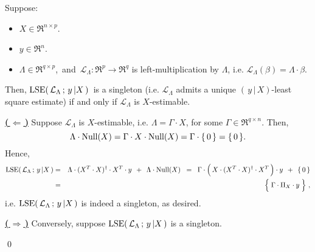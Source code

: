 \begin{theorem}
\mbox{}\vskip 0.1cm\noindent
Suppose:
\begin{itemize}
\item
	$X \in \Re^{n \times p}$.
\item
	$y \in \Re^{n}$.
\item
	$\Lambda \in \Re^{q \times p}$,\,
	and
	\,$\mathcal{L}_{\Lambda} : \Re^{p} \longrightarrow \Re^{q}$ is left-multiplication by $\Lambda$,
	i.e. $\mathcal{L}_{\Lambda}(\beta) = \Lambda \cdot \beta$.
\end{itemize}
Then,
	$\textnormal{LSE}\!\left(\,\mathcal{L}_{\Lambda} \,;\, y\,\vert X\,\right)$\,
	is a singleton (i.e. $\mathcal{L}_{\Lambda}$ admits a unique $(\,y\,\vert\,X)$-least square estimate)
	if and only if $\mathcal{L}_{\Lambda}$ is $X$-estimable.
\end{theorem}
\proof
\vskip 0.2cm\noindent
\underline{\textbf{(\,$\Longleftarrow$\,)}}\quad
Suppose $\mathcal{L}_{\Lambda}$ is $X$-estimable, i.e. $\Lambda = \Gamma \cdot X$,
for some $\Gamma \in \Re^{q \times n}$.
Then,
\begin{equation*}
\Lambda\cdot\textnormal{Null}(X) = \Gamma\cdot X \cdot \textnormal{Null}(X) = \Gamma \cdot \{\,0\,\} = \{\,0\,\}.
\end{equation*}
Hence,
\begin{eqnarray*}
\lse\!\left(\,\mathcal{L}_{\Lambda} \,;\, y\,\vert X\,\right)
&=&
	\Lambda \cdot (X^{T} \cdot X)^{\dagger} \cdot X^{T} \cdot y \;\, + \;\, \Lambda \cdot \Null(X)
\;\;=\;\;
	\Gamma \cdot \left(\,\overset{{\color{white}.}}{X} \cdot (X^{T} \cdot X)^{\dagger} \cdot X^{T}\,\right) \cdot y \;\, + \;\, \{\,0\,\}
\\
&=&
	\left\{\; \overset{{\color{white}.}}{\Gamma} \cdot \Pi_{X} \cdot y \;\right\}\,,
\end{eqnarray*}
i.e. $\textnormal{LSE}\!\left(\,\mathcal{L}_{\Lambda} \,;\, y\,\vert X\,\right)$ is indeed a singleton, as desired.

\vskip 0.5cm\noindent
\underline{\textbf{(\,$\Longrightarrow$\,)}}\quad
Conversely, suppose $\textnormal{LSE}\!\left(\,\mathcal{L}_{\Lambda} \,;\, y\,\vert X\,\right)$ is a singleton.

\qed

